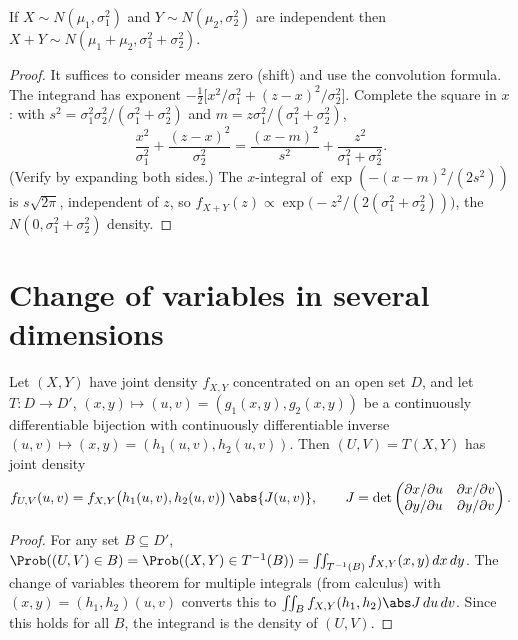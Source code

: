 \begin{theorem}\label{thm:normalsum}
If $X\sim N(\mu_1,\sigma_1^2)$ and $Y\sim N(\mu_2,\sigma_2^2)$ are independent then
$X+Y\sim N(\mu_1+\mu_2,\sigma_1^2+\sigma_2^2)$.
\end{theorem}
\begin{proof}
It suffices to consider means zero (shift) and use the convolution formula. The
integrand has exponent $-\tfrac12\bigl[x^2/\sigma_1^2+(z-x)^2/\sigma_2^2\bigr]$. Complete
the square in $x$: with $s^2=\sigma_1^2\sigma_2^2/(\sigma_1^2+\sigma_2^2)$ and
$m=z\sigma_1^2/(\sigma_1^2+\sigma_2^2)$,
\[
\frac{x^2}{\sigma_1^2}+\frac{(z-x)^2}{\sigma_2^2}
=\frac{(x-m)^2}{s^2}+\frac{z^2}{\sigma_1^2+\sigma_2^2}.
\]
(Verify by expanding both sides.) The $x$-integral of $\exp(-(x-m)^2/(2s^2))$ is
$s\sqrt{2\pi}$, independent of $z$, so
$f_{X+Y}(z)\propto\exp\bigl(-z^2/(2(\sigma_1^2+\sigma_2^2))\bigr)$, the
$N(0,\sigma_1^2+\sigma_2^2)$ density.
\end{proof}

\section{Change of variables in several dimensions}

\begin{theorem}\label{thm:jacobian}
Let $(X,Y)$ have joint density $f_{X,Y}$ concentrated on an open set $D$, and let
$T:D\to D'$, $(x,y)\mapsto(u,v)=(g_1(x,y),g_2(x,y))$ be a continuously
differentiable bijection with continuously differentiable inverse
$(u,v)\mapsto(x,y)=(h_1(u,v),h_2(u,v))$. Then $(U,V)=T(X,Y)$ has joint density
\[
f_{U,V}(u,v)=f_{X,Y}\bigl(h_1(u,v),h_2(u,v)\bigr)\,\abs{J(u,v)},\qquad
J=\det\begin{pmatrix}\partial x/\partial u&\partial x/\partial v\\
\partial y/\partial u&\partial y/\partial v\end{pmatrix}.
\]
\end{theorem}
\begin{proof}
For any set $B\subseteq D'$, $\Prob((U,V)\in B)=\Prob((X,Y)\in T^{-1}(B))=
\iint_{T^{-1}(B)}f_{X,Y}(x,y)\,dx\,dy$. The change of variables theorem for
multiple integrals (from calculus) with $(x,y)=(h_1,h_2)(u,v)$ converts this to
$\iint_Bf_{X,Y}(h_1,h_2)\abs J\,du\,dv$. Since this holds for all $B$, the
integrand is the density of $(U,V)$.
\end{proof}

